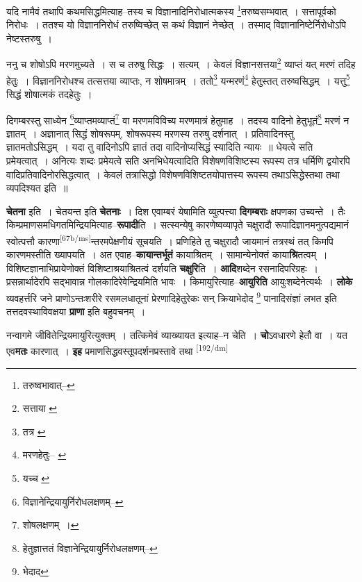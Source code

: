 \documentclass[article,12pt,a4paper]{memoir}
\begin{document}
	यदि नामैवं तथापि कथमसिद्धमित्याह--तस्य च विज्ञानादिनिरोधात्मकस्य \footnote{तरुष्वभावात्--\cite{dp-msB}}तरुष्वसम्भवात् । सत्तापूर्वको निरोधः । ततश्च यो विज्ञाननिरोधं तरुष्विच्छेत् स कथं विज्ञानं नेच्छेत् । तस्माद् विज्ञानानिष्टेर्निरोधोऽपि नेष्टस्तरुषु । 
	  
	ननु च शोषोऽपि मरणमुच्यते । स च तरुषु सिद्धः । सत्यम् । केवलं विज्ञानसत्तया\footnote{सत्ताया \cite{dp-msA}} व्याप्तं यत् मरणं तदिह हेतुः । विज्ञाननिरोधश्च तत्सत्तया व्याप्तः, न शोषमात्रम् । ततो\footnote{तत्र \cite{dp-msA}} यन्मरणं\footnote{मरणहेतुः--\cite{dp-msA} \cite{dp-msB} \cite{dp-edP} \cite{dp-edH} \cite{dp-edN}} हेतुस्तत् तरुष्वसिद्धम् । यत्तु\footnote{यच्च \cite{dp-msD}} सिद्धं शोषात्मकं तदहेतुः । 
	  
	दिगम्बरस्तु साध्येन \footnote{विज्ञानेन्द्रियायुर्निरोधलक्षणम्--\cite{dp-msD-n}}व्याप्तमव्याप्तं\footnote{शोषलक्षणम् ।} वा मरणमविविच्य मरणमात्रं हेतुमाह । तदस्य वादिनो हेतुभूतं\footnote{हेतुज्ञात्ततं \cite{dp-msA} विज्ञानेन्द्रियायुर्निरोधलक्षणम्--\cite{dp-msD-n}} मरणं न ज्ञातम् । अज्ञानात् सिद्धं शोषरूपम्, शोषरूपस्य मरणस्य तरुषु दर्शनात् । प्रतिवादिनस्तु ज्ञातमतोऽसिद्धम् । यदा तु वादिनोऽपि ज्ञातं तदा वादिनोप्यसिद्धं स्यादिति न्यायः ॥ धेयत्वे सति प्रमेयत्वात् । अनित्यः शब्दः प्रमेयत्वे सति अनभिधेयत्वादिति विशेषणविशिष्टस्य रूपस्य तत्र धर्मिणि द्वयोरपि वादिप्रतिवादिनोरसिद्धत्वात् । केवलं तत्रासिद्धो विशेषणविशिष्टतयोपात्तस्य रूपस्य तथाऽसिद्धेस्तथा तथा व्यपदिश्यत इति ॥
	\pend
      

	  \pstart \textbf{चेतना} इति । चेतयन्त इति \textbf{चेतनाः} । दिश एवाम्बरं येषामिति व्युत्पत्त्या \textbf{दिगम्बराः} क्षपणका उच्यन्ते । तैः किम्प्रमाणसमधिगतमिन्द्रियमित्याह--\textbf{रूपादी}ति । सत्स्वन्येषु कारणेष्वव्यापृते चक्षुरादौ रूपादिज्ञानमनुत्पद्यमानं स्वोत्पत्तौ कारणा\leavevmode\textsuperscript{\rmlatinfont\tiny [67b/ms]}न्तरमपेक्षणीयं सूचयति । प्रणिहिते तु चक्षुरादौ जायमानं तत्रस्थं तत् किमपि कारणमस्तीति ख्यापयति । अत एवाह--\textbf{कायान्तर्भूतं} कायाश्रितम् । सामान्येनोक्तं काया\textbf{श्रि}तत्वम् । विशिष्टज्ञानाभिप्रायेणोक्तं विशिष्टाश्रयाश्रितत्वं दर्शयति \textbf{चक्षुरि}ति । \textbf{आदि}शब्देन रसनादिपरिग्रहः । प्रसन्नार्थादेरपि सद्भावान्न गोलकादिरेवेन्द्रियमिति भावः । किमायुरित्याह--\textbf{आयुरिति} आयुःशब्देनेत्यर्थः । \textbf{लोके} व्यवहर्त्तरि जने प्राणोऽन्तःशरीरे रसमलधातूनां प्रेरणादिहेतुरेकः सन् क्रियाभेदोद \footnote{भेदाद} पानादिसंज्ञां लभत इति तत्तदवस्थाविवक्षया \textbf{प्राणा} इति बहुवचनम् ।
	\pend
      

	  \pstart नन्वागमे जीवितेन्द्रियमायुरित्युक्तम् । तत्किमेवं व्याख्यायत इत्याह--न चेति । \textbf{चो}ऽवधारणे हेतौ वा । यत एव\textbf{मतः} कारणात् । \textbf{इह} प्रमाणसिद्धवस्तूपदर्शनप्रस्तावे तथा  \leavevmode\textsuperscript{\rmlatinfont\tiny [192/dm]} 
	  
\end{document}
